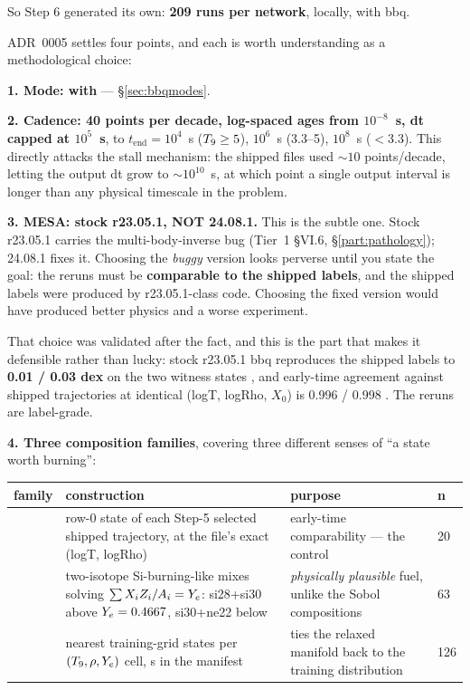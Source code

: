 So Step 6 generated its own: \textbf{209 runs per network}, locally, with bbq.

ADR~0005 settles four points, and each is worth understanding as a
methodological choice:

\textbf{1. Mode:  with } ---
\S\ref{sec:bbqmodes}.

\textbf{2. Cadence: 40 points per decade, log-spaced ages from $10^{-8}$~s, dt
capped at $10^{5}$~s}, to $t_{\mathrm{end}} = 10^{4}$~s ($T_{9} \ge 5$),
$10^{6}$~s (3.3--5), $10^{8}$~s ($< 3.3$). This directly attacks the stall
mechanism: the shipped files used ${\sim}10$ points/decade, letting the output
dt grow to ${\sim}10^{10}$~s, at which point a single output interval is longer
than any physical timescale in the problem.

\textbf{3. MESA: stock r23.05.1, NOT 24.08.1.} This is the subtle one. Stock
r23.05.1 carries the  multi-body-inverse bug (Tier~1 \S VI.6,
\S\ref{part:pathology}); 24.08.1 fixes it. Choosing the \emph{buggy} version
looks perverse until you state the goal: the reruns must be \textbf{comparable
to the shipped labels}, and the shipped labels were produced by r23.05.1-class
code. Choosing the fixed version would have produced better physics and a worse
experiment.

That choice was validated after the fact, and this is the part that makes it
defensible rather than lucky: stock r23.05.1 bbq reproduces the shipped labels
to \textbf{0.01 / 0.03 dex} on the two witness states ,
and early-time agreement against shipped trajectories at identical
(logT, logRho, $X_{0}$) is 0.996 / 0.998 . The reruns
are label-grade.

\textbf{4. Three composition families}, covering three different senses of ``a
state worth burning'':

\begingroup\small
\begin{center}
\begin{tabularx}{\textwidth}{@{}L{1.7cm} Y L{4.3cm} L{0.7cm}@{}}
\toprule
\textbf{family} & \textbf{construction} & \textbf{purpose} & \textbf{n} \\
\midrule
{} & row-0 state of each Step-5 selected shipped trajectory, at the
  file's exact (logT, logRho) & early-time comparability --- the control & 20 \\
 & two-isotope Si-burning-like mixes solving
  $\sum X_i Z_i/A_i = Y_{e}$: si28+si30 above $Y_{e} = 0.4667$, si30+ne22 below &
  \emph{physically plausible} fuel, unlike the Sobol compositions & 63 \\
 & nearest training-grid states per $(T_{9}, \rho, Y_{e})$ cell,
  s in the manifest & ties the relaxed manifold back to the
  training distribution & 126 \\
\bottomrule
\end{tabularx}
\end{center}
\endgroup


